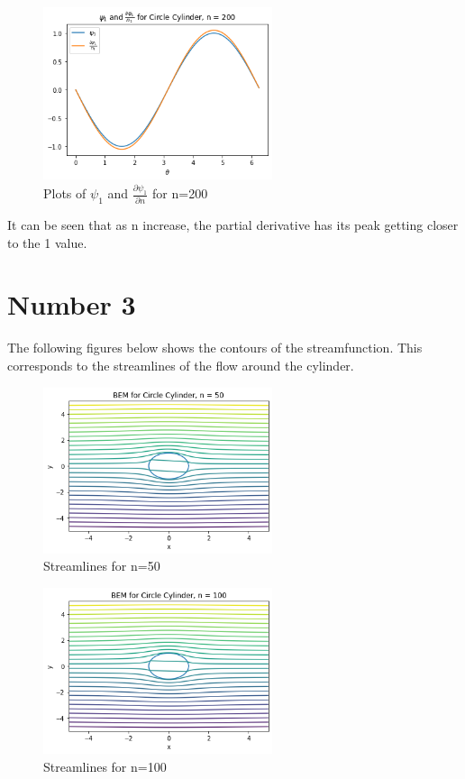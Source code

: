 \documentclass{article}
\begin{document}
		\begin{figure}[H]
			\centering
			\includegraphics[width=0.6\textwidth]{images/cl200.png}
			\caption{ Plots of $\psi_1$ and $\frac{\partial \psi_1}{\partial n}$ for n=200}
		\end{figure}
	
		It can be seen that as n increase, the partial derivative has its peak getting closer to the 1 value.
	
	\section*{Number 3}
		The following figures below shows the contours of the streamfunction. This corresponds to the streamlines of the flow around the cylinder. 
		
		\begin{figure}[H]
			\centering
			\includegraphics[width=0.6\textwidth]{images/c50.png}
			\caption{ Streamlines for n=50}
		\end{figure}
	
		\begin{figure}[H]
			\centering
			\includegraphics[width=0.6\textwidth]{images/c100.png}
			\caption{ Streamlines for n=100}
		\end{figure}
	
\end{document}
